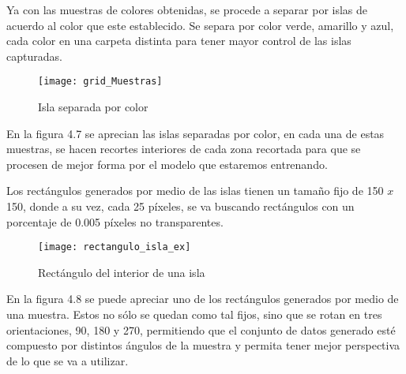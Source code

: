 Ya con las muestras de colores obtenidas, se procede a separar por islas de acuerdo al color que este establecido. Se separa por color verde, amarillo y azul, cada color en una carpeta distinta para tener mayor control de las islas capturadas.

\begin{figure}[H]
  \centering
  \begin{minipage}[b]{0.6\textwidth}
        \texttt{[image: grid\_Muestras]}
    \caption{Isla separada por color}
  \end{minipage}
\end{figure}

En la figura 4.7 se aprecian las islas separadas por color, en cada una de estas muestras, se hacen recortes interiores de cada zona recortada para que se procesen de mejor forma por el modelo que estaremos entrenando. 

Los rectángulos generados por medio de las islas tienen un tamaño fijo de 150 $x$ 150, donde a su vez, cada 25 píxeles, se va buscando rectángulos con un porcentaje de 0.005 píxeles no transparentes.


\begin{figure}[h]
  \centering
  \begin{minipage}[b]{0.7\textwidth}
        \texttt{[image: rectangulo\_isla\_ex]}
    \caption{Rectángulo del interior de una isla}
  \end{minipage}
\end{figure}


En la figura 4.8 se puede apreciar uno de los rectángulos generados por medio de una muestra. Estos no sólo se quedan como tal fijos, sino que se rotan en tres orientaciones, 90, 180 y 270, permitiendo que el conjunto de datos generado esté compuesto por distintos ángulos de la muestra y permita tener mejor perspectiva de lo que se va a utilizar.

\break

%
%
%
%
%

